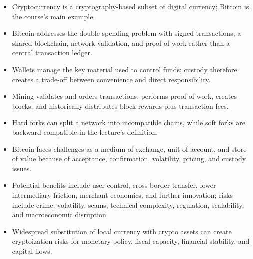 \begin{chapterrecap}
\begin{itemize}
  \item Cryptocurrency is a cryptography-based subset of digital currency; Bitcoin is the course's main example.
  \item Bitcoin addresses the double-spending problem with signed transactions, a shared blockchain, network validation, and proof of work rather than a central transaction ledger.
  \item Wallets manage the key material used to control funds; custody therefore creates a trade-off between convenience and direct responsibility.
  \item Mining validates and orders transactions, performs proof of work, creates blocks, and historically distributes block rewards plus transaction fees.
  \item Hard forks can split a network into incompatible chains, while soft forks are backward-compatible in the lecture's definition.
  \item Bitcoin faces challenges as a medium of exchange, unit of account, and store of value because of acceptance, confirmation, volatility, pricing, and custody issues.
  \item Potential benefits include user control, cross-border transfer, lower intermediary friction, merchant economics, and further innovation; risks include crime, volatility, scams, technical complexity, regulation, scalability, and macroeconomic disruption.
  \item Widespread substitution of local currency with crypto assets can create cryptoization risks for monetary policy, fiscal capacity, financial stability, and capital flows.
\end{itemize}
\end{chapterrecap}
